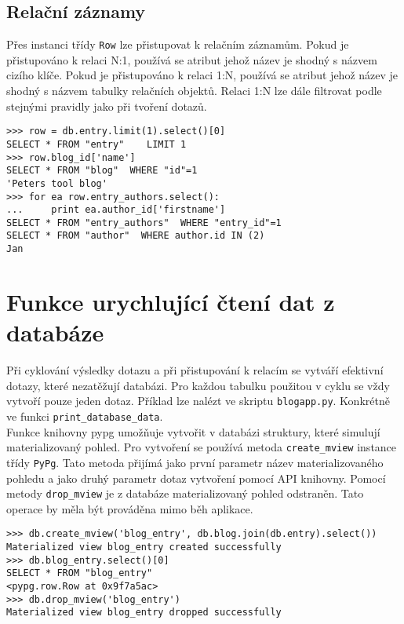 \documentclass[11pt]{article}
\begin{document}
\subsection{Relační záznamy}

Přes instanci třídy \lstinline[style=inline]|Row| lze přistupovat k relačním záznamům. Pokud je přistupováno k relaci N:1, používá se atribut jehož název je shodný s názvem cizího klíče. Pokud je přistupováno k relaci 1:N, používá se atribut jehož název je shodný s názvem tabulky relačních objektů. Relaci 1:N lze dále filtrovat podle stejnými pravidly jako při tvoření dotazů.

\begin{lstlisting}[style=python]
>>> row = db.entry.limit(1).select()[0]
SELECT * FROM "entry"    LIMIT 1
>>> row.blog_id['name']
SELECT * FROM "blog"  WHERE "id"=1
'Peters tool blog'
>>> for ea row.entry_authors.select():
...     print ea.author_id['firstname']
SELECT * FROM "entry_authors"  WHERE "entry_id"=1   
SELECT * FROM "author"  WHERE author.id IN (2)  
Jan
\end{lstlisting}

\section{Funkce urychlující čtení dat z databáze}

Při cyklování výsledky dotazu a při přistupování k relacím se vytváří efektivní dotazy, které nezatěžují databázi. Pro každou tabulku použitou v cyklu se vždy vytvoří pouze jeden dotaz. Příklad lze nalézt ve skriptu \lstinline[style=inline]|blogapp.py|. Konkrétně ve funkci \lstinline[style=inline]|print_database_data|. \\
Funkce knihovny pypg umožňuje vytvořit v databázi struktury, které simulují materializovaný pohled. Pro vytvoření se používá metoda \lstinline[style=inline]|create_mview| instance třídy \lstinline[style=inline]|PyPg|. Tato metoda přijímá jako první parametr název materializovaného pohledu a jako druhý parametr dotaz vytvoření pomocí API knihovny. Pomocí metody \lstinline[style=inline]|drop_mview| je z databáze materializovaný pohled odstraněn. Tato operace by měla být prováděna mimo běh aplikace.

\begin{lstlisting}[style=python]
>>> db.create_mview('blog_entry', db.blog.join(db.entry).select())
Materialized view blog_entry created successfully
>>> db.blog_entry.select()[0]
SELECT * FROM "blog_entry"   
<pypg.row.Row at 0x9f7a5ac>
>>> db.drop_mview('blog_entry')
Materialized view blog_entry dropped successfully
\end{lstlisting}
\end{document}
